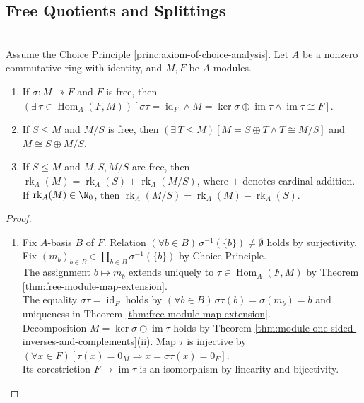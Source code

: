 \subsection{Free Quotients and Splittings}

\begin{theorem} \label{thm:epimorphism-onto-free-module-splits} \\
Assume the Choice Principle \ref{princ:axiom-of-choice-analysis}. Let $A$ be a nonzero commutative ring with identity, and $M,F$ be $A$-modules.
\begin{enumerate}[label=(\roman*)]
\setlength{\itemsep}{0pt}
\item If $\sigma:M\twoheadrightarrow F$ and $F$ is free, then $(\exists\,\tau\in\operatorname{Hom}_A(F,M))[\sigma\tau=\operatorname{id}_F\land M=\ker\sigma\oplus\operatorname{im}\tau\land\operatorname{im}\tau\cong F]$.
\item If $S\leq M$ and $M/S$ is free, then $(\exists\,T\leq M)[M=S\oplus T\land T\cong M/S]$ and $M\cong S\oplus M/S$.
\item If $S\leq M$ and $M,S,M/S$ are free, then $\operatorname{rk}_A(M)=\operatorname{rk}_A(S)+\operatorname{rk}_A(M/S)$, where $+$ denotes cardinal addition.\\
If $\operatorname{rk}_A(M)\in\N_0$, then $\operatorname{rk}_A(M/S)=\operatorname{rk}_A(M)-\operatorname{rk}_A(S)$.
\end{enumerate}
\begin{proof}
\begin{enumerate}[label=(\roman*)]
\setlength{\itemsep}{0pt}
\item Fix $A$-basis $B$ of $F$. Relation $(\forall b\in B)\,\sigma^{-1}(\{b\})\neq\emptyset$ holds by surjectivity. Fix $(m_b)_{b\in B}\in\prod\limits_{b\in B}\sigma^{-1}(\{b\})$ by Choice Principle.\\
The assignment $b\mapsto m_b$ extends uniquely to $\tau\in\operatorname{Hom}_A(F,M)$ by Theorem \ref{thm:free-module-map-extension}.\\
The equality $\sigma\tau=\operatorname{id}_F$ holds by $(\forall b\in B)\,\sigma\tau(b)=\sigma(m_b)=b$ and uniqueness in Theorem \ref{thm:free-module-map-extension}.\\
Decomposition $M=\ker\sigma\oplus\operatorname{im}\tau$ holds by Theorem \ref{thm:module-one-sided-inverses-and-complements}(ii). Map $\tau$ is injective by $(\forall x\in F)[\tau(x)=0_M\Rightarrow x=\sigma\tau(x)=0_F]$.\\
Its corestriction $F\to\operatorname{im}\tau$ is an isomorphism by linearity and bijectivity.

\end{enumerate}
\end{proof}
\end{theorem}
